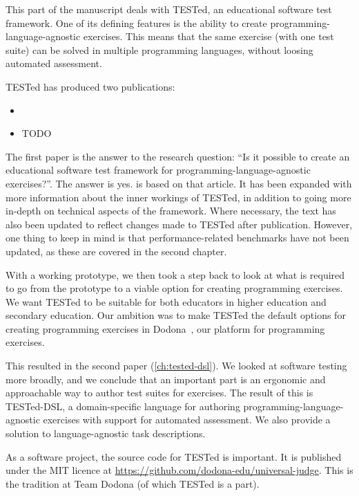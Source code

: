 \documentclass[./main]{subfiles}
\begin{document}
This part of the manuscript deals with TESTed, an educational software test framework.
One of its defining features is the ability to create programming-language-agnostic exercises.
This means that the same exercise (with one test suite) can be solved in multiple programming languages, without loosing automated assessment.

TESTed has produced two publications:

\begin{itemize}
    \item {}
    \item TODO
\end{itemize}

The first paper is the answer to the research question: ``Is it possible to create an educational software test framework for programming-language-agnostic exercises?''.
The answer is yes.
 is based on that article.
It has been expanded with more information about the inner workings of TESTed, in addition to going more in-depth on technical aspects of the framework.
Where necessary, the text has also been updated to reflect changes made to TESTed after publication.
However, one thing to keep in mind is that performance-related benchmarks have not been updated, as these are covered in the second chapter.

With a working prototype, we then took a step back to look at what is required to go from the prototype to a viable option for creating programming exercises.
We want TESTed to be suitable for both educators in higher education and secondary education.
Our ambition was to make TESTed the default options for creating programming exercises in Dodona~\autocite{vanpetegemDodonaLearnCode2023}, our platform for programming exercises.

This resulted in the second paper (\cref{ch:tested-dsl}).
We looked at software testing more broadly, and we conclude that an important part is an ergonomic and approachable way to author test suites for exercises.
The result of this is TESTed-DSL, a domain-specific language for authoring programming-language-agnostic exercises with support for automated assessment.
We also provide a solution to language-agnostic task descriptions.

As a software project, the source code for TESTed is important.
It is published under the MIT licence at \url{https://github.com/dodona-edu/universal-judge}.
This is the tradition at Team Dodona (of which TESTed is a part).
\end{document}
